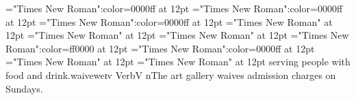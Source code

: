 \font\examplesensearticlesectionletter="Times New Roman":color=0000ff at 12pt
\font\exampleusefirstoftypelastoftypesensearticlesectionletter="Times New Roman":color=0000ff at 12pt
\font\firstoftypegrammarcategorylastoftypesensearticlesectionletter="Times New Roman":color=0000ff at 12pt
\font\firstoftypelastoftypestressfirstoftypelastoftypepronunciationarticlesectionletter="Times New Roman" at 12pt
\font\firstoftypelastoftypepronunciationarticlesectionletter="Times New Roman" at 12pt
\font\firstoftypeheadwordlastoftypesectionletter="Times New Roman" at 12pt
\font\sensebeforearticlesectionletter="Times New Roman":color=ff0000 at 12pt
\font\sensearticlesectionletter="Times New Roman":color=0000ff at 12pt
\font\articlesectionletter="Times New Roman" at 12pt
\font\sectionletter="Times New Roman" at 12pt
\sensearticlesectionletter serving people with food and drink.\firstoftypeheadwordlastoftypesectionletter waive\firstoftypelastoftypepronunciationarticlesectionletter w\firstoftypelastoftypestressfirstoftypelastoftypepronunciationarticlesectionletter eɪ\firstoftypelastoftypepronunciationarticlesectionletter v \firstoftypegrammarcategorylastoftypesensearticlesectionletter Verb\exampleusefirstoftypelastoftypesensearticlesectionletter V n\examplesensearticlesectionletter The art gallery waives admission charges on Sundays.

\bye
